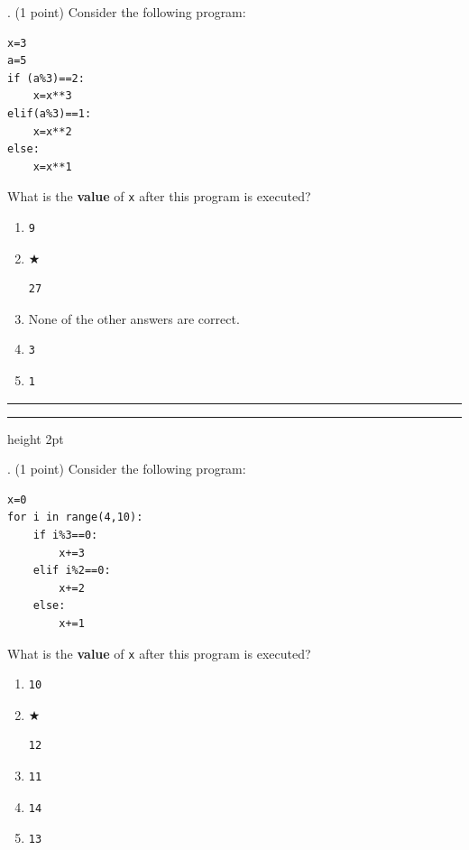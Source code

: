 \documentclass{article}
\begin{document}
\newpage
{}. (1 point)
Consider the following program:
\begin{verbatim}
x=3
a=5
if (a%3)==2:
    x=x**3
elif(a%3)==1:
    x=x**2
else:
    x=x**1
\end{verbatim}
What is the \textbf{value} of \texttt{x} after this program is executed?


\begin{enumerate}
\item[(A)]
\begin{verbatim}9\end{verbatim}

\item[(B)] $\bigstar$ 
\begin{verbatim}27\end{verbatim}

\item[(C)]
None of the other answers are correct.

\item[(D)]
\begin{verbatim}3\end{verbatim}

\item[(E)]
\begin{verbatim}1\end{verbatim}

\end{enumerate}

\vspace*{2em}
\hrule
\vspace{2em}

\vspace{2em}
\hrule height 2pt


\newpage
{}. (1 point)
Consider the following program:
\begin{verbatim}
x=0
for i in range(4,10):
    if i%3==0:
        x+=3
    elif i%2==0:
        x+=2
    else:
        x+=1
\end{verbatim}
What is the \textbf{value} of \texttt{x} after this program is executed?


\begin{enumerate}
\item[(A)]
\begin{verbatim}10\end{verbatim}

\item[(B)] $\bigstar$ 
\begin{verbatim}12\end{verbatim}

\item[(C)]
\begin{verbatim}11\end{verbatim}

\item[(D)]
\begin{verbatim}14\end{verbatim}

\item[(E)]
\begin{verbatim}13\end{verbatim}

\end{enumerate}
\end{document}
